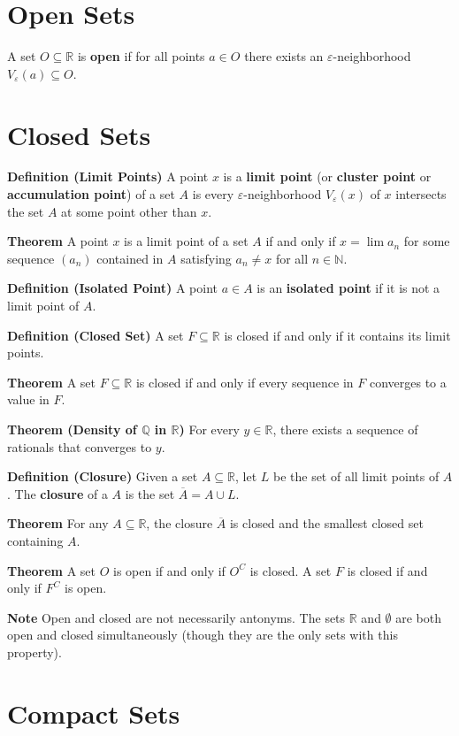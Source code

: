 \documentclass[12pt]{article}
\newcommand{\N}{\mathbb{N}}
\newcommand{\Q}{\mathbb{Q}}
\newcommand{\R}{\mathbb{R}}
\begin{document}
\section{Open Sets}

A set $O \subseteq \R$ is \textbf{open} if for all points $a \in O$ there exists an $\varepsilon$-neighborhood $V_{\varepsilon}(a) \subseteq O$.

\section{Closed Sets}

\textbf{Definition (Limit Points)} A point $x$ is a \textbf{limit point} (or \textbf{cluster point} or \textbf{accumulation point}) of a set $A$ is every $\varepsilon$-neighborhood $V_{\varepsilon}(x)$ of $x$ intersects the set $A$ at some point other than $x$.

\textbf{Theorem} A point $x$ is a limit point of a set $A$ if and only if $x = \lim a_n$ for some sequence $(a_n)$ contained in $A$ satisfying $a_n \neq x$ for all $n \in \N$.

\textbf{Definition (Isolated Point)} A point $a \in A$ is an \textbf{isolated point} if it is not a limit point of $A$.

\textbf{Definition (Closed Set)} A set $F \subseteq \R$ is closed if and only if it contains its limit points.

\textbf{Theorem} A set $F \subseteq \R$ is closed if and only if every sequence in $F$ converges to a value in $F$.

\textbf{Theorem (Density of $\Q$ in $\R$)} For every $y \in \R$, there exists a sequence of rationals that converges to $y$.

\textbf{Definition (Closure)} Given a set $A \subseteq \R$, let $L$ be the set of all limit points of $A$. The \textbf{closure} of a $A$ is the set $\overline{A} = A \cup L$.

\textbf{Theorem} For any $A \subseteq \R$, the closure $\overline{A}$ is closed and the smallest closed set containing $A$.

\textbf{Theorem} A set $O$ is open if and only if $O^C$ is closed. A set $F$ is closed if and only if $F^C$ is open.

\textbf{Note} Open and closed are not necessarily antonyms. The sets $\R$ and $\emptyset$ are both open and closed simultaneously (though they are the only sets with this property).

\section{Compact Sets}
\end{document}
